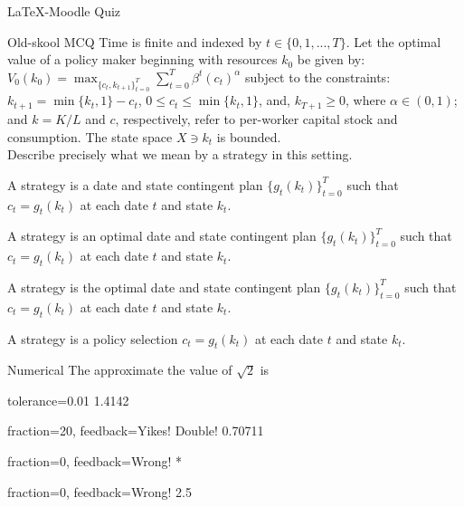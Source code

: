 \documentclass{article}
\begin{document}
\begin{quiz}{LaTeX-Moodle Quiz}

    \begin{multi}[single]{Old-skool MCQ}
        Time is finite and indexed by $t \in \{0, 1, ...,T\}$. %
        Let the optimal value of a policy maker beginning with %
        resources $k_{0}$ be given by:
        $V_{0}(k_{0}) = %
        \max_{\{c_{t}, k_{t+1}\}_{t=0}^{T}}%
        \sum_{t=0}^{T}\beta^{t} (c_{t})^{\alpha}$ %
        subject to the constraints: %
        $k_{t+1} = \min\{k_{t},1\} - c_{t}$, %
        $0 \leq c_{t} \leq \min\{k_{t},1\}$, %
        and, $k_{T+1} \geq 0$, %
        where $\alpha \in (0,1)$; and $k=K/L$ and $c$, respectively, %
        refer to per-worker capital stock and consumption. %
        The state space $X \ni k_{t}$ is bounded.
        \\
        Describe precisely what we mean by a strategy in this setting. 
		\item* A strategy is a date and state contingent plan %
        $\{g_{t}(k_{t})\}_{t=0}^{T}$ such that %
        $c_{t} = g_{t}(k_{t})$ at each date $t$ and state $k_{t}$.
		\item A strategy is an optimal date and state contingent plan %
        $\{g_{t}(k_{t})\}_{t=0}^{T}$ such that %
        $c_{t} = g_{t}(k_{t})$ at each date $t$ and state $k_{t}$.
		\item A strategy is the optimal date and state contingent plan %
        $\{g_{t}(k_{t})\}_{t=0}^{T}$ such that $c_{t} = g_{t}(k_{t})$ %
        at each date $t$ and state $k_{t}$.
		\item A strategy is a policy selection $c_{t} = g_{t}(k_{t})$ %
        at each date $t$ and state $k_{t}$.
    \end{multi}

    \begin{numerical}[tolerance=0.01]{Numerical}
        The approximate the value of $\sqrt{2}$ is
        \item[tolerance={0.01}] 1.4142
        \item[fraction=20, feedback={Yikes! Double!}] 0.70711
        \item[fraction=0, feedback={Wrong!}] *
        \item[fraction=0, feedback={Wrong!}] 2.5
    \end{numerical}


\end{quiz}
\end{document}
